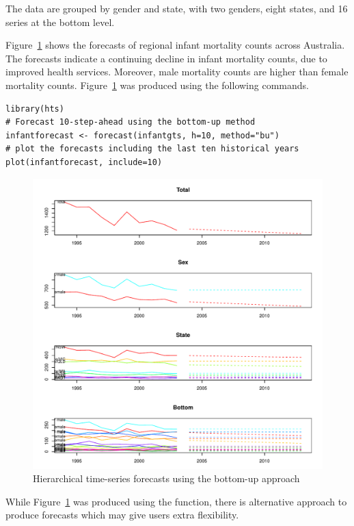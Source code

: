 \documentclass[nojss]{jss}
\begin{document}
The data are grouped by gender and state, with two genders, eight states, and 16 series at the bottom level.

Figure~\ref{fig:3} shows the forecasts of regional infant mortality counts across Australia. The forecasts indicate a continuing decline in infant mortality counts, due to improved health services. Moreover, male mortality counts are higher than female mortality counts. Figure~\ref{fig:3} was produced using the following commands.
\begin{Verbatim}
library(hts)
# Forecast 10-step-ahead using the bottom-up method
infantforecast <- forecast(infantgts, h=10, method="bu")
# plot the forecasts including the last ten historical years
plot(infantforecast, include=10)
\end{Verbatim}
   
\begin{figure}[!htbp]
\caption{Hierarchical time-series forecasts using the bottom-up approach}\label{fig:3}
\centering
\includegraphics[width=14cm]{forecasthts}
\end{figure}

While Figure~\ref{fig:3} was produced using the  function, there is alternative approach to produce forecasts which may give users extra flexibility.
\end{document}
